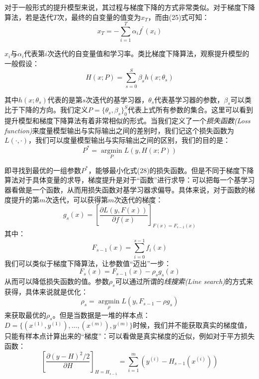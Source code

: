 \documentclass[UTF8, 12pt]{ctexart}
\begin{document}
对于一般形式的提升模型来说，其过程与梯度下降的方式非常类似。对于梯度下降算法，若是迭代$T$次，最终的自变量的值变为$x_{T}$，而由(25)式可知：
\begin{equation}
	x_{T} = -\sum_{i=1}^{T} \alpha_{i}f^{'}(x_{i})
\end{equation}

$x_{i}$与$\alpha_{i}$代表第$i$次迭代的自变量值和学习率。类比梯度下降算法，观察提升模型的一般假设：
\begin{equation}
	H(x;P) = \sum_{s=0}^{S} {\beta_{s}h(x;\theta_{s})}
\end{equation}

其中$h(x;\theta_{s})$代表的是第$s$次迭代的基学习器，$\theta_{s}$代表基学习器的参数，$\beta_{s}$可以类比于下降的方向。我们定义$P=\{\theta_{s},\beta_{s}\}_{0}^{S}$代表上式所有参数的集合。这里可以看到提升模型和梯度下降算法有着非常相似的形式。当我们定义了一个\emph{损失函数(Loss function)}来度量模型输出与实际输出之间的差别时，我们记这个损失函数为$L(·,·)$，我们可以度量模型输出与实际输出之间的区别，我们的目的是：
\begin{equation}
	P^{*} = \operatorname*{argmin}\limits_{P}L(y,H(x;P))
\end{equation}

即寻找到最优的一组参数$P^{*}$，能够最小化式(28)的损失函数。但是不同于梯度下降算法对于具体变量的求导，梯度提升是对于“函数”进行求导\cite{chen2015xgboost}\cite{friedman2001greedy}：可以把每一个基学习器看做是一个函数，从而用损失函数对基学习器求偏导。具体来说，对于函数的梯度提升的第$m$次迭代，可以获得第$m$次迭代的梯度：
\begin{equation}
	g_{s}(x) = {[\frac{\partial L(y,F(x))}{\partial f(x)}]}_{F(x)=F_{s-1}(x)}
\end{equation}
其中：
\begin{equation}
	F_{s-1}(x) = \sum_{i=0}^{s-1}f_{i}(x)
\end{equation}
我们可以类似于梯度下降算法，让参数值“迈出”一步：
\begin{equation}
	F_{s}(x) = F_{s-1}(x) - \rho_{s}g_{s}(x)
\end{equation}
从而可以降低损失函数的值。参数$\rho_{s}$可以通过所谓的\emph{线搜索(Line search)}的方式来获得，具体来说就是优化：
\begin{equation}
	\rho_{s} = \operatorname*{argmin}\limits_{\rho}L(y,F_{s-1}-\rho g_{s})
\end{equation}
来获取最优的$\rho_{s}$。但是当数据是一堆的样本点：$D=\{(x^{(1)}, y^{(1)}),...,(x^{(m)}), y^{(m)}\}$时候，我们并不能获取真实的梯度值，只能有样本点计算出来的“梯度”：可以看做是真实梯度的近似，例如对于平方损失函数：
\begin{equation}
	{[\frac{\partial (y-H)^{2}/2}{\partial H}]}_{H=H_{s-1}} = \sum_{i=1}^{m} (y^{(i)} - H_{s-1}(x^{(i)}))
\end{equation}
\end{document}

